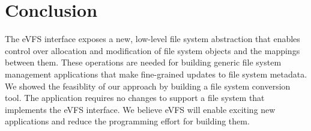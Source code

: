 \documentclass[letterpaper,twocolumn,10pt]{article}
\begin{document}

\vspace{-0.75em}
\section{Conclusion\label{sec:Conclusion}}
\vspace{-0.25em}

The eVFS interface exposes a new, low-level file system abstraction that enables control over allocation and modification of file system objects and the mappings between them. These operations are needed for building generic file system management applications that make fine-grained updates to file system metadata. We showed the feasiblity of our approach by building a file system conversion tool. The application requires no changes to support a file system that implements the eVFS interface. We believe eVFS will enable exciting new applications and reduce the programming effort for building them.


{\footnotesize 
}
\end{document}
